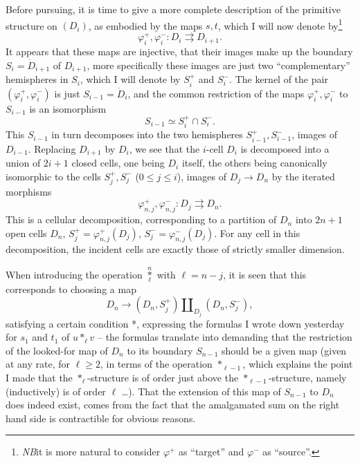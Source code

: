 %
\label{sec:7}%
Before pursuing, it is time to give a more complete description of the
primitive structure on $(D_i)$, as embodied by the maps $s,t$, which I
will now denote by\footnote{\emph{NB}\enspace it is more natural to consider
  $\varphi^+$ as ``target'' and $\varphi^-$ as ``source''.}
\[\varphi_i^+,\varphi_i^- :  D_i \rightrightarrows D_{i+1}. \]
It appears that these maps are injective, that their images make
up the boundary $S_i = \dot D_{i+1}$ of $D_{i+1}$, more
specifically these images are just two ``complementary'' hemispheres
in $S_i$, which I will denote by $S_i^+$ and $S_i^-$. The kernel of
the pair $(\varphi_i^+, \varphi_i^-)$ is just $S_{i-1} = \dot D_i$,
and the common restriction of the maps $\varphi_i^+, \varphi_i^-$ to
$S_{i-1}$ is an isomorphism
\[ S_{i-1} \simeq S_i^+ \cap S_i^-.\]
This $S_{i-1}$ in turn decomposes into the two hemispheres $S_{i-1}^+,
S_{i-1}^-$, images of $D_{i-1}$. Replacing $D_{i+1}$ by $D_i$, we see
that the $i$-cell $D_i$ is decomposed into a union of $2i+1$ closed
cells, one being $D_i$ itself, the others being canonically isomorphic
to the cells $S_j^+,S_j^-$ ($0\le j\le i$), images of $D_j\to D_n$ by
the iterated morphisms
\[\varphi_{n,j}^+,\varphi_{n,j}^- :  D_j \rightrightarrows D_n. \]
This is a cellular decomposition, corresponding to a partition of
$D_n$ into $2n+1$ open cells $D_n$, $S_j^+ = \varphi_{n,j}^+(D_j)$,
$S_j^- = \varphi_{n,j}^-(D_j)$. For any cell in this decomposition,
the incident cells are exactly those of strictly smaller dimension.

When introducing the operation $\overset{n}{\underset{\ell}{*}}$ with
$\ell=n-j$, it is seen that this corresponds to choosing a map
\[ D_n \to (D_n, S_j^+) \amalg_{D_j} (D_n, S_j^-),\]
satisfying a certain condition *, expressing the formulas I wrote down
yesterday for $s_1$ and $t_1$ of $u *_\ell v$ -- the formulas
translate into demanding that the restriction of the looked-for map of
$D_n$ to its boundary $S_{n-1}$ should be a given map (given at any
rate, for $\ell\ge2$, in terms of the operation $*_{\ell-1}$, which
explains the point I made that the $*_\ell$-structure is of order just
above the $*_{\ell-1}$-structure, namely (inductively) is of order
$\ell$ \ldots). That the extension of this map of $S_{n-1}$ to $D_n$
does indeed exist, comes from the fact that the amalgamated sum on the
right hand side is contractible for obvious reasons.

